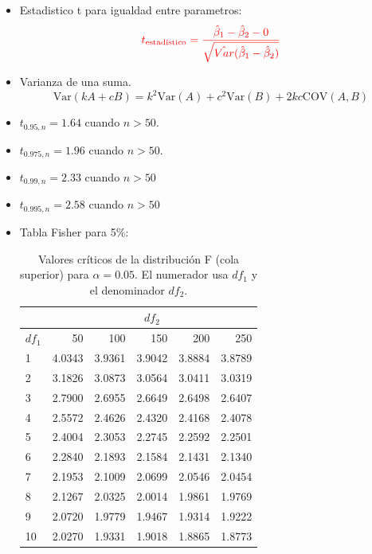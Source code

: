 \documentclass[10pt,a4paper]{article}
\begin{document}
\begin{enumerate}
\begin{itemize}
Con

$$\color{red}SSR_{ur} = \sum_{g=1}^G SSR_g$$

\item Estadistico t para igualdad entre parametros:
 \[\color{red}t_{\text{estadístico}} = \frac{\hat{\beta}_1 - \hat{\beta}_2 - 0}{\sqrt{\hat{Var}(\hat{\beta}_1 - \hat{\beta}_2)}}\]


\item  Varianza de una suma.
{\color{red}
$$\text{Var}(kA + cB) = k^2\text{Var}(A) + c^2\text{Var}(B) + 2kc\text{COV}(A, B)$$}

\item $t_{0.95,n} = 1.64$ cuando $n >50$.
\item $t_{0.975,n} = 1.96$ cuando $n >50$.
\item $t_{0.99,n}=2.33$ cuando $n>50$
\item $t_{0.995,n}=2.58$ cuando $n>50$


\item Tabla Fisher para 5\%:
\begin{table}[H]
\centering
\caption{Valores críticos de la distribución F (cola superior) para $\alpha=0.05$. 
El numerador usa $df_1$ y el denominador $df_2$.}
\label{tab:Fcrit_5pct}
\begin{tabular}{|l|r|r|r|r|r|}
\hline
& \multicolumn{5}{c|}{$df_2$} \\
\hline
$df_1$ & 50 & 100 & 150 & 200 & 250 \\
\hline
1  & 4.0343 & 3.9361 & 3.9042 & 3.8884 & 3.8789 \\
\hline
2  & 3.1826 & 3.0873 & 3.0564 & 3.0411 & 3.0319 \\
\hline
3  & 2.7900 & 2.6955 & 2.6649 & 2.6498 & 2.6407 \\
\hline
4  & 2.5572 & 2.4626 & 2.4320 & 2.4168 & 2.4078 \\
\hline
5  & 2.4004 & 2.3053 & 2.2745 & 2.2592 & 2.2501 \\
\hline
6  & 2.2840 & 2.1893 & 2.1584 & 2.1431 & 2.1340 \\
\hline
7  & 2.1953 & 2.1009 & 2.0699 & 2.0546 & 2.0454 \\
\hline
8  & 2.1267 & 2.0325 & 2.0014 & 1.9861 & 1.9769 \\
\hline
9  & 2.0720 & 1.9779 & 1.9467 & 1.9314 & 1.9222 \\
\hline
10 & 2.0270 & 1.9331 & 1.9018 & 1.8865 & 1.8773 \\
\hline
\end{tabular}
\end{table}


\end{itemize}

 \end{enumerate}
\end{document}
